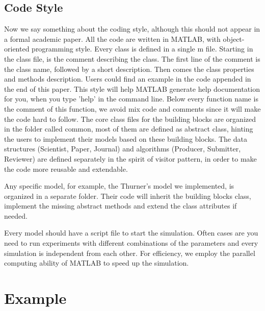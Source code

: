 \documentclass[11pt]{article}
\begin{document}
\subsection{Code Style}
Now we say something about the coding style, although this should not appear in a formal academic paper. All the code are written in MATLAB, with object-oriented programming style. Every class is defined in a single m file. Starting in the class file, is the comment describing the class. The first line of the comment is the class name, followed by a short description. Then comes the class properties and methods description. Users could find an example in the code appended in the end of this paper. This style will help MATLAB generate help documentation for you, when you type 'help' in the command line. Below every function name is the comment of this function, we avoid mix code and comments since it will make the code hard to follow. The core class files for the building blocks are organized in the folder called common, most of them are defined as abstract class, hinting the users to implement their models based on these building blocks. The data structures (Scientist, Paper, Journal) and algorithms (Producer, Submitter, Reviewer) are defined separately in the spirit of visitor pattern, in order to make the code more reusable and extendable.

Any specific model, for example, the Thurner's model we implemented, is organized in a separate folder. Their code will inherit the building blocks class, implement the missing abstract methods and extend the class attributes if needed.

Every model should have a script file to start the simulation. Often cases are you need to run experiments with different combinations of the parameters and every simulation is independent from each other. For efficiency, we employ the parallel computing ability of MATLAB to speed up the simulation.

\section{Example}
\end{document}

